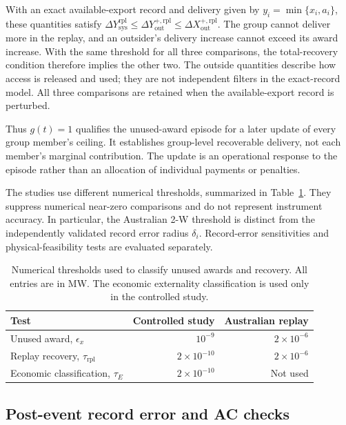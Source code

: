 \documentclass[11pt]{article}
\begin{document}
With an exact available-export record and delivery given by
$y_i=\min\{x_i,a_i\}$, these quantities satisfy
$\Delta Y_{\mathrm{sys}}^{\mathrm{rpl}}
\le\Delta Y_{\mathrm{out}}^{+,\mathrm{rpl}}
\le\Delta X_{\mathrm{out}}^{+,\mathrm{rpl}}$.
The group cannot deliver more in the replay, and an outsider's delivery increase
cannot exceed its award increase. With the same threshold for all three
comparisons, the total-recovery condition therefore implies the other two.
The outside quantities describe how access is released and used; they are not
independent filters in the exact-record model. All three comparisons are
retained when the available-export record is perturbed.

Thus $g(t)=1$ qualifies the unused-award episode for a later update of every
group member's ceiling. It establishes group-level recoverable delivery, not
each member's marginal contribution. The update is an operational response to
the episode rather than an allocation of individual payments or penalties.

The studies use different numerical thresholds, summarized in
Table~\ref{tab:supp_decision_tolerances}. They suppress numerical near-zero
comparisons and do not represent instrument accuracy. In particular, the
Australian 2-W threshold is distinct from the independently validated record
error radius $\delta_i$. Record-error sensitivities and physical-feasibility
tests are evaluated separately.

\begin{table}[!ht]
\centering
\caption{Numerical thresholds used to classify unused awards and recovery.
All entries are in MW. The economic externality classification is used only in
the controlled study.}
\label{tab:supp_decision_tolerances}
\small
\begin{tabular}{@{}lrr@{}}
\toprule
Test & Controlled study & Australian replay \\
\midrule
Unused award, $\epsilon_x$ & $10^{-9}$ & $2\times10^{-6}$ \\
Replay recovery, $\tau_{\mathrm{rpl}}$ & $2\times10^{-10}$ & $2\times10^{-6}$ \\
Economic classification, $\tau_E$ & $2\times10^{-10}$ & Not used \\
\bottomrule
\end{tabular}
\end{table}

\subsection{Post-event record error and AC checks}
\end{document}
